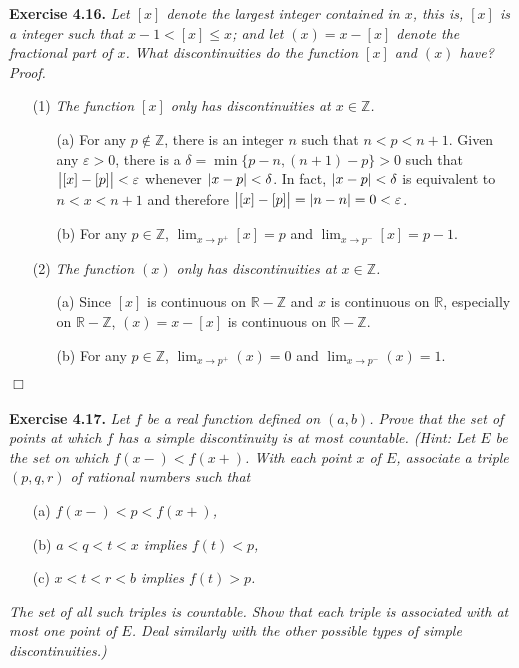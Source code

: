 \documentclass{article}
\begin{document}
\textbf{Exercise 4.16.}
\emph{Let $[x]$ denote the largest integer contained in $x$, this is,
$[x]$ is a integer such that $x-1 < [x] \leq x$;
and let $(x) = x - [x]$ denote the fractional part of $x$.
What discontinuities do the function $[x]$ and $(x)$ have?} \\

\emph{Proof.}

\begin{enumerate}
\item[(1)]
\emph{The function $[x]$ only has discontinuities at $x \in \mathbb{Z}$.}
  \begin{enumerate}
  \item[(a)]
  For any $p \not\in \mathbb{Z}$,
  there is an integer $n$ such that $n < p < n+1$.
  Given any $\varepsilon > 0$, there is a $\delta = \min\{p-n, (n+1)-p\} > 0$
  such that $\abs{[x] - [p]} < \varepsilon$
  whenever $\abs{x - p} < \delta$.
  In fact, $\abs{x - p} < \delta$ is equivalent to $n < x < n+1$
  and therefore $\abs{[x] - [p]} = \abs{n - n} = 0 < \varepsilon$.
  \item[(b)]
  For any $p \in \mathbb{Z}$,
  $\lim_{x \to p^{+}}[x] = p$ and $\lim_{x \to p^{-}}[x] = p-1$.
  \end{enumerate}
\item[(2)]
\emph{The function $(x)$ only has discontinuities at $x \in \mathbb{Z}$.}
  \begin{enumerate}
  \item[(a)]
  Since $[x]$ is continuous on $\mathbb{R} - \mathbb{Z}$ and
  $x$ is continuous on $\mathbb{R}$, especially on $\mathbb{R} - \mathbb{Z}$,
  $(x) = x - [x]$ is continuous on $\mathbb{R} - \mathbb{Z}$.
  \item[(b)]
  For any $p \in \mathbb{Z}$,
  $\lim_{x \to p^{+}}(x) = 0$ and $\lim_{x \to p^{-}}(x) = 1$.
  \end{enumerate}
\end{enumerate}
$\Box$ \\\\





\textbf{Exercise 4.17.}
\emph{Let $f$ be a real function defined on $(a,b)$.
Prove that the set of points at which $f$ has a simple discontinuity is at most countable.
(Hint: Let $E$ be the set on which $f(x-) < f(x+)$.
With each point $x$ of $E$, associate a triple $(p,q,r)$ of rational numbers such that}
\begin{enumerate}
  \item[(a)]
  \emph{$f(x-) < p < f(x+)$,}
  \item[(b)]
  \emph{$a < q < t < x$ implies $f(t) < p$,}
  \item[(c)]
  \emph{$x < t < r < b$ implies $f(t) > p$.}
\end{enumerate}
\emph{The set of all such triples is countable.
Show that each triple is associated with at most one point of $E$.
Deal similarly with the other possible types of simple discontinuities.)} \\
\end{document}
